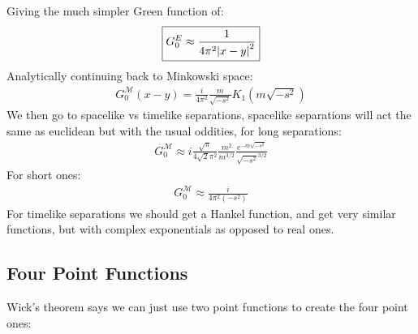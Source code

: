 \documentclass[12pt]{article}
\begin{document}
Giving the much simpler Green function of:
\begin{align*}
  \boxed{G_0^E\approx\frac{1}{4\pi^2\abs{x-y}^2}}
\end{align*}
Analytically continuing back to Minkowski space:
\begin{align*}
  G_0^{\mathcal{M}}(x-y)=\frac{i}{4\pi^2}\frac{m}{\sqrt{-s^2}}K_1(m\sqrt{-s^2})
\end{align*}
We then go to spacelike vs timelike separations, spacelike separations will act the same as euclidean but with the usual oddities, for long separations:
\begin{align*}
  \boxed{G_0^{\mathcal{M}}\approx i\frac{\sqrt{\pi}}{4\sqrt{2}\pi^2}
    \frac{m^2}{m^{3/2}}\frac{e^{-m\sqrt{-s^2}}}{\sqrt{-s^2}^{3/2}}}
\end{align*}
For short ones:
\begin{align*}
  \boxed{G_0^{\mathcal{M}}\approx\frac{i}{4\pi^2(-s^2)}}
\end{align*}
For timelike separations we should get a Hankel function, and get very similar functions, but with complex exponentials as opposed to real ones.
\subsection{Four Point Functions}
Wick's theorem says we can just use two point functions to create the four point ones:
\begin{align*}
  
\end{align*}
\end{document}
